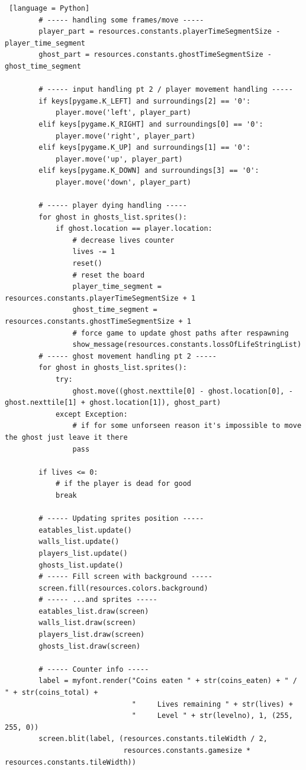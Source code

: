 \documentclass[11pt,a4paper,notitlepage]{report}
\begin{document}
\begin{lstlisting} [language = Python]
        # ----- handling some frames/move -----
        player_part = resources.constants.playerTimeSegmentSize - player_time_segment
        ghost_part = resources.constants.ghostTimeSegmentSize - ghost_time_segment

        # ----- input handling pt 2 / player movement handling -----
        if keys[pygame.K_LEFT] and surroundings[2] == '0':
            player.move('left', player_part)
        elif keys[pygame.K_RIGHT] and surroundings[0] == '0':
            player.move('right', player_part)
        elif keys[pygame.K_UP] and surroundings[1] == '0':
            player.move('up', player_part)
        elif keys[pygame.K_DOWN] and surroundings[3] == '0':
            player.move('down', player_part)

        # ----- player dying handling -----
        for ghost in ghosts_list.sprites():
            if ghost.location == player.location:
                # decrease lives counter
                lives -= 1
                reset()
                # reset the board
                player_time_segment = resources.constants.playerTimeSegmentSize + 1
                ghost_time_segment = resources.constants.ghostTimeSegmentSize + 1
                # force game to update ghost paths after respawning
                show_message(resources.constants.lossOfLifeStringList)
        # ----- ghost movement handling pt 2 -----
        for ghost in ghosts_list.sprites():
            try:
                ghost.move((ghost.nexttile[0] - ghost.location[0], -ghost.nexttile[1] + ghost.location[1]), ghost_part)
            except Exception:
                # if for some unforseen reason it's impossible to move the ghost just leave it there
                pass

        if lives <= 0:
            # if the player is dead for good
            break

        # ----- Updating sprites position -----
        eatables_list.update()
        walls_list.update()
        players_list.update()
        ghosts_list.update()
        # ----- Fill screen with background -----
        screen.fill(resources.colors.background)
        # ----- ...and sprites -----
        eatables_list.draw(screen)
        walls_list.draw(screen)
        players_list.draw(screen)
        ghosts_list.draw(screen)

        # ----- Counter info -----
        label = myfont.render("Coins eaten " + str(coins_eaten) + " / " + str(coins_total) +
                              "     Lives remaining " + str(lives) +
                              "     Level " + str(levelno), 1, (255, 255, 0))
        screen.blit(label, (resources.constants.tileWidth / 2,
                            resources.constants.gamesize * resources.constants.tileWidth))


\end{lstlisting}
\end{document}
